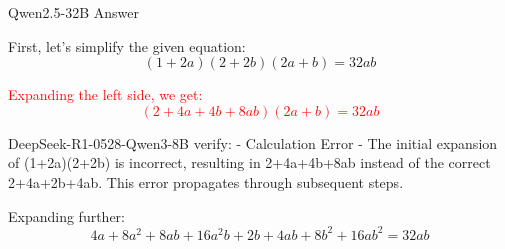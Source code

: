 \begin{answerbox}{Qwen2.5-32B Answer}

First, let's simplify the given equation:
\[(1+2a)(2+2b)(2a+b) = 32ab\]

\textcolor{red}{Expanding the left side, we get:
\[(2 + 4a + 4b + 8ab)(2a + b) = 32ab\]}
\begin{tcolorbox}[
    colback=blue!5!white,         %
    colframe=blue!40!white,       %
]
DeepSeek-R1-0528-Qwen3-8B verify: - Calculation Error - The initial expansion of (1+2a)(2+2b) is incorrect, resulting in 2+4a+4b+8ab instead of the correct 2+4a+2b+4ab. This error propagates through subsequent steps.

\end{tcolorbox}

Expanding further:
\[4a + 8a^2 + 8ab + 16a^2b + 2b + 4ab + 8b^2 + 16ab^2 = 32ab\]
\end{answerbox}
